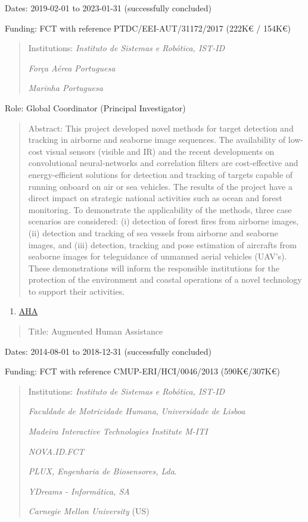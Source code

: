 \documentclass[
]{article}
\begin{document}
Dates: 2019-02-01 to 2023-01-31 (successfully concluded)

Funding: FCT with reference PTDC/EEI-AUT/31172/2017 (222K€ / 154K€)

\begin{quote}
Institutions: \emph{Instituto de Sistemas e Robótica, IST-ID}

\emph{Força Aérea Portuguesa}

\emph{Marinha Portuguesa}
\end{quote}

Role: Global Coordinator (Principal Investigator)

\begin{quote}
Abstract: This project developed novel methods for target detection and
tracking in airborne and seaborne image sequences. The availability of
low-cost visual sensors (visible and IR) and the recent developments on
convolutional neural-networks and correlation filters are cost-effective
and energy-efficient solutions for detection and tracking of targets
capable of running onboard on air or sea vehicles. The results of the
project have a direct impact on strategic national activities such as
ocean and forest monitoring. To demonstrate the applicability of the
methods, three case scenarios are considered: (i) detection of forest
fires from airborne images, (ii) detection and tracking of sea vessels
from airborne and seaborne images, and (iii) detection, tracking and
pose estimation of aircrafts from seaborne images for teleguidance of
unmanned aerial vehicles (UAV's). These demonstrations will inform the
responsible institutions for the protection of the environment and
coastal operations of a novel technology to support their activities.
\end{quote}

\begin{enumerate}
\def\labelenumi{\arabic{enumi}.}
\setcounter{enumi}{3}
\item
  \ul{AHA}
\end{enumerate}

\begin{quote}
Title: Augmented Human Assistance
\end{quote}

Dates: 2014-08-01 to 2018-12-31 (successfully concluded)

Funding: FCT with reference CMUP-ERI/HCI/0046/2013 (590K€/307K€)

\begin{quote}
Institutions: \emph{Instituto de Sistemas e Robótica, IST-ID}

\emph{Faculdade de Motricidade Humana}, \emph{Universidade de Lisboa}

\emph{Madeira Interactive Technologies Institute M-ITI}

\emph{NOVA.ID.FCT}

\emph{PLUX, Engenharia de Biosensores, Lda}.

\emph{YDreams - Informática, SA}

\emph{Carnegie Mellon University} (US)
\end{quote}
\end{document}
